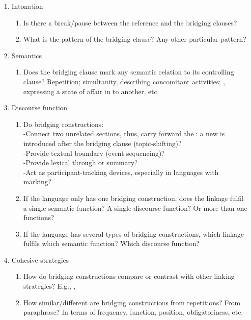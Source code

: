 \documentclass[output=paper]{LSP/langsci}
\begin{document}
\begin{enumerate}
\item  Intonation
\begin{enumerate}
\item  Is there a break/pause between the reference and the bridging clauses? 
\item  What is the  pattern of the bridging clause? Any other particular  pattern?
\end{enumerate}

\item   Semantics
\begin{enumerate}
\item Does the bridging clause mark any semantic relation to its controlling clause? Repetition; simultanity, describing concomitant activities; , expressing a state of affair in  to another, etc.
\end{enumerate}

\item   Discourse function 
\begin{enumerate}
\item  Do bridging constructions: \\
-Connect two unrelated sections, thus, carry forward the : a new  is introduced after the bridging clause (topic-shifting)?\\
-Provide textual boundary (event sequencing)?\\
-Provide lexical  through  or summary?\\
-Act as participant-tracking devices, especially in languages with  marking? 
\item  If the language only has one bridging construction, does the linkage fulfil a single semantic function? A single discourse function? Or more than one functions?
\item  If the language has several types of bridging constructions, which linkage fulfils which semantic function? Which discourse function?
\end{enumerate}

\item   Cohesive strategies
\begin{enumerate}
\item How do bridging constructions compare or contrast with other linking strategies? 
E.g., ,  
\item  How similar/different are bridging constructions from repetitions? From paraphrase?
In terms of frequency, function, position, obligatoriness, etc.
\end{enumerate}


\end{enumerate}
\end{document}
